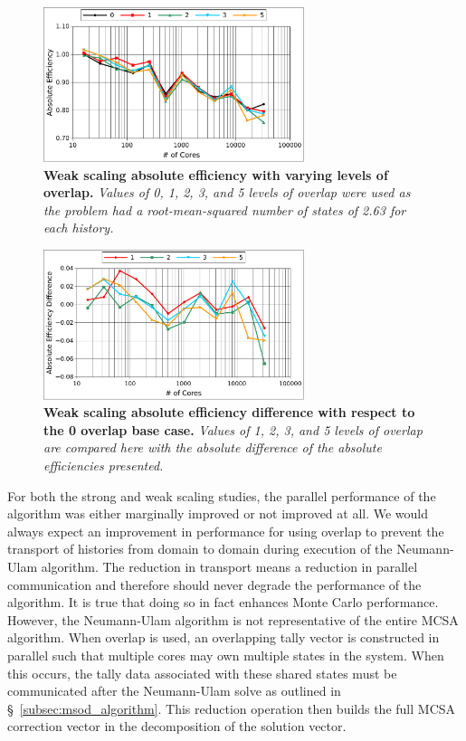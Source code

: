 \documentclass{snamc2013}
\begin{document}
\begin{figure}[h!]
  \begin{center}
    \includegraphics[width=3in]{titan_weak_overlap.pdf}
  \end{center}
  \caption{\textbf{Weak scaling absolute efficiency with varying
      levels of overlap.} \textit{Values of 0, 1, 2, 3, and 5 levels
      of overlap were used as the problem had a root-mean-squared
      number of states of 2.63 for each history.}}
  \label{fig:titan_weak_overlap}
\end{figure}

\begin{figure}[h!]
  \begin{center}
    \includegraphics[width=3in]{titan_weak_overlap_diff.pdf}
  \end{center}
  \caption{\textbf{Weak scaling absolute efficiency difference with
      respect to the 0 overlap base case.} \textit{Values of 1, 2, 3,
      and 5 levels of overlap are compared here with the absolute
      difference of the absolute efficiencies presented.}}
  \label{fig:titan_weak_overlap_diff}
\end{figure}

For both the strong and weak scaling studies, the parallel performance
of the algorithm was either marginally improved or not improved at
all. We would always expect an improvement in performance for using
overlap to prevent the transport of histories from domain to domain
during execution of the Neumann-Ulam algorithm. The reduction in
transport means a reduction in parallel communication and therefore
should never degrade the performance of the algorithm. It is true that
doing so in fact enhances Monte Carlo performance. However, the
Neumann-Ulam algorithm is not representative of the entire MCSA
algorithm. When overlap is used, an overlapping tally vector is
constructed in parallel such that multiple cores may own multiple
states in the system. When this occurs, the tally data associated with
these shared states must be communicated after the Neumann-Ulam solve
as outlined in \S~\ref{subsec:msod_algorithm}. This reduction
operation then builds the full MCSA correction vector in the
decomposition of the solution vector. 
\end{document}
